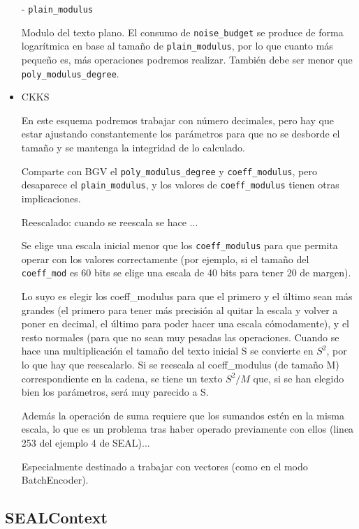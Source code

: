 \begin{itemize}
  - \verb|plain_modulus|

  Modulo del texto plano. El consumo de \verb|noise_budget| se produce de forma logarítmica en base al tamaño de \verb|plain_modulus|, por lo que cuanto más pequeño es, más operaciones podremos realizar. También debe ser menor que \verb|poly_modulus_degree|.

  \item CKKS

  En este esquema podremos trabajar con número decimales, pero hay que estar ajustando constantemente los parámetros para que no se desborde el tamaño y se mantenga la integridad de lo calculado.

  Comparte con BGV el \verb|poly_modulus_degree| y \verb|coeff_modulus|, pero desaparece el \verb|plain_modulus|, y los valores de \verb|coeff_modulus| tienen otras implicaciones.

  Reescalado: cuando se reescala se hace ...

  Se elige una escala inicial menor que los \verb|coeff_modulus| para que permita operar con los valores correctamente (por ejemplo, si el tamaño del \verb|coeff_mod| es 60 bits se elige una escala de 40 bits para tener 20 de margen).

  Lo suyo es elegir los coeff\_modulus para que el primero y el último sean más grandes (el primero para tener más precisión al quitar la escala y volver a poner en decimal, el último para poder hacer una escala cómodamente), y el resto normales (para que no sean muy pesadas las operaciones. Cuando se hace una multiplicación el tamaño del texto inicial S se convierte en $S^2$, por lo que hay que reescalarlo. Si se reescala al coeff\_modulus (de tamaño M) correspondiente en la cadena, se tiene un texto $S^2/M$ que, si se han elegido bien los parámetros, será muy parecido a S.

  Además la operación de suma requiere que los sumandos estén en la misma escala, lo que es un problema tras haber operado previamente con ellos (linea 253 del ejemplo 4 de SEAL)...

  Especialmente destinado a trabajar con vectores (como en el modo BatchEncoder).

\end{itemize}

\subsection{SEALContext}


